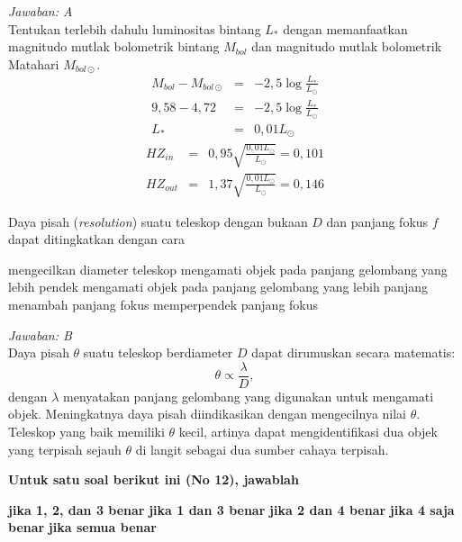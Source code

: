 \documentclass[11pt,fleqn]{exam}
\begin{document}
\begin{questions}
\textit{Jawaban: A}\\
Tentukan terlebih dahulu luminositas bintang $L_*$ dengan memanfaatkan magnitudo mutlak bolometrik bintang $M_{bol}$ dan magnitudo mutlak bolometrik Matahari $M_{bol \odot}$.
\begin{eqnarray*}
M_{bol}-M_{bol \odot} &=& -2,5\log\frac{L_*}{L_{\odot}}\\
9,58-4,72 &=& -2,5\log\frac{L_*}{L_{\odot}}\\
L_* &=& 0,01L_{\odot}
\end{eqnarray*}
\begin{eqnarray*}
HZ_{in} &=& 0,95\sqrt{\frac{0,01L_{\odot}}{L_{\odot}}} = 0,101\\
HZ_{out} &=& 1,37\sqrt{\frac{0,01L_{\odot}}{L_{\odot}}}=0,146
\end{eqnarray*}

\vspace{0.3cm}
\question Daya pisah (\textit{resolution}) suatu teleskop dengan bukaan $D$ dan panjang fokus $f$ dapat ditingkatkan dengan cara
\begin{choices}
\choice mengecilkan diameter teleskop
\choice mengamati objek pada panjang gelombang yang lebih pendek
\choice mengamati objek pada panjang gelombang yang lebih panjang
\choice menambah panjang fokus
\choice memperpendek panjang fokus
\end{choices}

\textit{Jawaban: B}\\
Daya pisah $\theta$ suatu teleskop berdiameter $D$ dapat dirumuskan secara matematis:
$$\theta\propto\frac{\lambda}{D},$$ 
dengan $\lambda$ menyatakan panjang gelombang yang digunakan untuk mengamati objek. Meningkatnya daya pisah diindikasikan dengan mengecilnya nilai $\theta$. Teleskop yang baik memiliki $\theta$ kecil, artinya dapat mengidentifikasi dua objek yang terpisah sejauh $\theta$ di langit sebagai dua sumber cahaya terpisah.

\vspace{0.5cm}
\textbf{Untuk satu soal berikut ini (No 12), jawablah}
\begin{choices}
\choice \textbf{jika 1, 2, dan 3 benar}
\choice \textbf{jika 1 dan 3 benar}
\choice \textbf{jika 2 dan 4 benar}
\choice \textbf{jika 4 saja benar}
\choice \textbf{jika semua benar}
\end{choices}


\end{questions}
\end{document}
